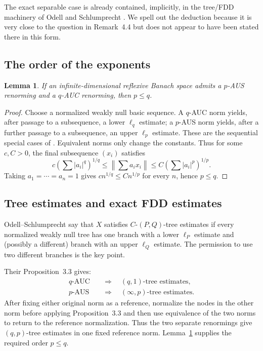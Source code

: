 \documentclass[11pt]{article}
\newtheorem{lemma}[theorem]{Lemma}
\theoremstyle{definition}
\theoremstyle{remark}
\newcommand{\norm}[1]{\left\lVert #1\right\rVert}
\begin{document}
The exact separable case is already contained, implicitly, in the tree/FDD
machinery of Odell and Schlumprecht \cite{OS}.  We spell out the deduction
because it is very close to the question in Remark~4.4 but does not appear to
have been stated there in this form.

\subsection{The order of the exponents}

\begin{lemma}\label{lem:p-le-q}
If an infinite-dimensional reflexive Banach space admits a \(p\)-AUS
renorming and a \(q\)-AUC renorming, then \(p\le q\).
\end{lemma}

\begin{proof}
Choose a normalized weakly null basic sequence.  A \(q\)-AUC norm yields,
after passage to a subsequence, a lower \(\ell_q\) estimate; a \(p\)-AUS
norm yields, after a further passage to a subsequence, an upper \(\ell_p\)
estimate.  These are the sequential special cases of
\cite[Proposition~3.3]{OS}.  Equivalent norms only change the constants.
Thus for some \(c,C>0\), the final subsequence \((x_i)\) satisfies
\[
 c\left(\sum|a_i|^q\right)^{1/q}
 \le \norm{\sum a_ix_i}
 \le C\left(\sum|a_i|^p\right)^{1/p}.
\]
Taking \(a_1=\cdots=a_n=1\) gives
\(cn^{1/q}\le Cn^{1/p}\) for every \(n\), hence \(p\le q\).
\end{proof}

\subsection{Tree estimates and exact FDD estimates}

Odell--Schlumprecht say that \(X\) satisfies \(C\)-\((P,Q)\)-tree estimates
if every normalized weakly null tree has one branch with a lower
\(\ell_P\) estimate and (possibly a different) branch with an upper
\(\ell_Q\) estimate.  The permission to use two different branches is the
key point.

Their Proposition~3.3 gives:
\begin{align*}
 q\text{-AUC}&\quad\Longrightarrow\quad(q,1)\text{-tree estimates},\\
 p\text{-AUS}&\quad\Longrightarrow\quad(\infty,p)\text{-tree estimates}.
\end{align*}
After fixing either original norm as a reference, normalize the nodes in the
other norm before applying Proposition~3.3 and then use equivalence of the two
norms to return to the reference normalization.  Thus the two separate
renormings give \((q,p)\)-tree estimates in one fixed reference norm.
Lemma~\ref{lem:p-le-q} supplies the required order
\(p\le q\).
\end{document}
